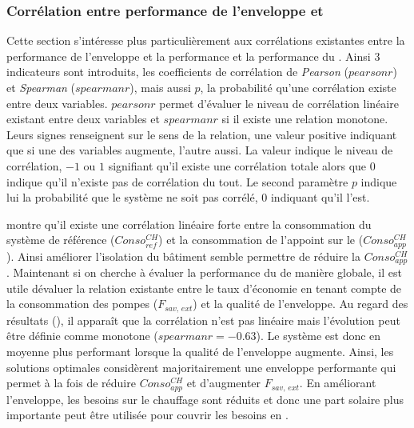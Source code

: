 \subsubsection{Corrélation entre performance de l’enveloppe et } %
\label{ssub:correlation_entre_performance_de_l_enveloppe_et_ssc}
Cette section s’intéresse plus particulièrement aux corrélations existantes entre la
performance de l’enveloppe et la performance et la performance du . Ainsi $3$
indicateurs sont introduits, les coefficients de corrélation de \textit{Pearson}
($pearsonr$) et \textit{Spearman} ($spearmanr$), mais aussi $p$, la probabilité qu’une
corrélation existe entre deux variables. $pearsonr$ permet d’évaluer le niveau de
corrélation linéaire existant entre deux variables et $spearmanr$ si il existe une
relation monotone. Leurs signes renseignent sur le sens de la relation, une valeur
positive indiquant que si une des variables augmente, l’autre aussi. La valeur indique le
niveau de corrélation, $-1$ ou $1$ signifiant qu’il existe une corrélation totale alors
que $0$ indique qu’il n’existe pas de corrélation du tout. Le second paramètre $p$ indique
lui la probabilité que le système ne soit pas corrélé, $0$ indiquant qu’il l’est.

 montre qu’il existe une corrélation linéaire forte entre la
consommation du système de référence ($Conso_{ref}^{CH}$) et la consommation de l’appoint sur
le  ($Conso_{app}^{CH}$). Ainsi améliorer l’isolation du bâtiment semble permettre
de réduire la $Conso_{app}^{CH}$. Maintenant si on cherche à évaluer la performance du
 de manière globale, il est utile dévaluer la relation existante entre
le taux d’économie en tenant compte de la consommation des pompes ($F_{sav,\,ext}$)
et la qualité de l’enveloppe. Au regard des résultats (),
il apparaît que la corrélation n’est pas linéaire mais l’évolution peut être définie
comme monotone ($spearmanr = \num{-0.63}$). Le système est donc en moyenne plus performant
lorsque la qualité de l’enveloppe augmente. Ainsi, les solutions optimales
considèrent majoritairement une enveloppe performante qui permet à la fois de réduire
$Conso_{app}^{CH}$ et d’augmenter $F_{sav,\,ext}$. En améliorant l’enveloppe, les besoins
sur le chauffage sont réduits et donc une part solaire plus importante peut être
utilisée pour couvrir les besoins en .

